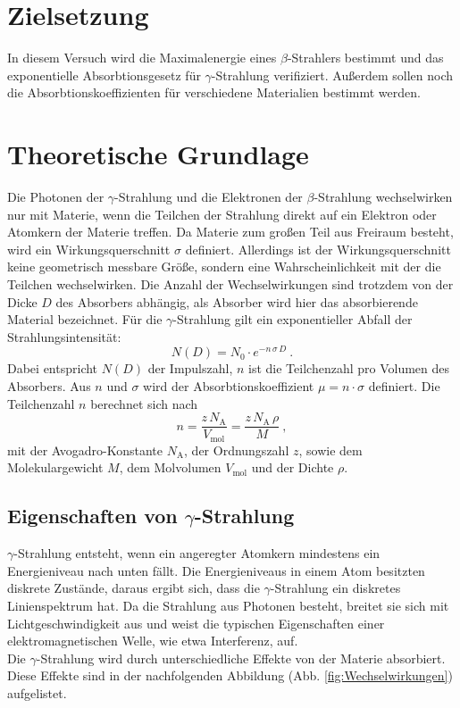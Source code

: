 \section{Zielsetzung}
\label{sec:Zielsetzung}
In diesem Versuch wird die Maximalenergie eines $\beta$-Strahlers bestimmt und das exponentielle Absorbtionsgesetz für $\gamma$-Strahlung verifiziert. Außerdem sollen noch die Absorbtionskoeffizienten für verschiedene Materialien bestimmt werden.

\section{Theoretische Grundlage}
\label{sec:Theorie}
Die Photonen der $\gamma$-Strahlung und die Elektronen der $\beta$-Strahlung wechselwirken nur mit Materie, wenn die Teilchen der Strahlung direkt auf ein Elektron oder Atomkern der Materie treffen. Da Materie zum großen Teil aus Freiraum besteht, wird ein Wirkungsquerschnitt $\sigma$ definiert. Allerdings ist der Wirkungsquerschnitt keine geometrisch messbare Größe, sondern eine Wahrscheinlichkeit mit der die Teilchen wechselwirken. Die Anzahl der Wechselwirkungen sind trotzdem von der Dicke $D$ des Absorbers abhängig, als Absorber wird hier das absorbierende Material bezeichnet. Für die $\gamma$-Strahlung gilt ein exponentieller Abfall der Strahlungsintensität:
\begin{equation}
	N(D) = N_0 \cdot e^{-n\,\sigma\,D} \ .
	\label{eqn:N}
\end{equation}
Dabei entspricht $N(D)$ der Impulszahl, $n$ ist die Teilchenzahl pro Volumen des Absorbers. Aus $n$ und $\sigma$ wird der Absorbtionskoeffizient $\mu = n \cdot \sigma$ definiert. Die Teilchenzahl $n$ berechnet sich nach
\begin{equation}
	n = \frac{z\,N_\text{A}}{V_\text{mol}} = \frac{z\,N_\text{A}\,\rho}{M} \ ,
	\label{eqn:n}
\end{equation}
mit der Avogadro-Konstante $N_\text{A}$, der Ordnungszahl $z$, sowie dem Molekulargewicht $M$, dem Molvolumen $V_\text{mol}$ und der Dichte $\rho$.


\subsection{Eigenschaften von \texorpdfstring{$\gamma$}{}-Strahlung}
$\gamma$-Strahlung entsteht, wenn ein angeregter Atomkern mindestens ein Energieniveau nach unten fällt. Die Energieniveaus in einem Atom besitzten diskrete Zustände, daraus ergibt sich, dass die $\gamma$-Strahlung ein diskretes Linienspektrum hat. Da die Strahlung aus Photonen besteht, breitet sie sich mit Lichtgeschwindigkeit aus und weist die typischen Eigenschaften einer elektromagnetischen Welle, wie etwa Interferenz, auf. \\
Die $\gamma$-Strahlung wird durch unterschiedliche Effekte von der Materie absorbiert. Diese Effekte sind in der nachfolgenden Abbildung (Abb. \eqref{fig:Wechselwirkungen}) aufgelistet.

